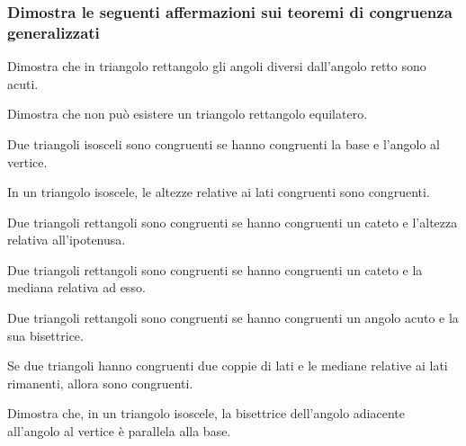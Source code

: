 \subsubsection*{Dimostra le seguenti affermazioni sui teoremi di congruenza generalizzati}
\begin{multicols}{2}

\begin{esercizio}
\label{ese:3.53}
Dimostra che in triangolo rettangolo gli angoli diversi dall'angolo retto sono acuti.
\end{esercizio}

\begin{esercizio}
\label{ese:3.54}
Dimostra che non può esistere un triangolo rettangolo equilatero.
\end{esercizio}

\begin{esercizio}
\label{ese:3.55}
Due triangoli isosceli sono congruenti se hanno congruenti la base e l'angolo al vertice.
\end{esercizio}

\begin{esercizio}
\label{ese:3.56}
In un triangolo isoscele, le altezze relative ai lati congruenti sono congruenti. 
\end{esercizio}

\begin{esercizio}
\label{ese:3.57}
Due triangoli rettangoli sono congruenti se hanno congruenti un cateto e l'altezza relativa all'ipotenusa.
\end{esercizio}

\begin{esercizio}
\label{ese:3.58}
Due triangoli rettangoli sono congruenti se hanno congruenti un cateto e la mediana relativa ad esso.
\end{esercizio}

\begin{esercizio}
\label{ese:3.59}
Due triangoli rettangoli sono congruenti se hanno congruenti un angolo acuto e la sua bisettrice.
\end{esercizio}

\begin{esercizio}
\label{ese:3.60}
Se due triangoli hanno congruenti due coppie di lati e le mediane relative ai lati rimanenti, allora sono congruenti.
\end{esercizio}

\begin{esercizio}
\label{ese:3.61}
Dimostra che, in un triangolo isoscele, la bisettrice dell'angolo adiacente all'angolo al vertice è parallela alla base.
\end{esercizio}


\end{multicols}
